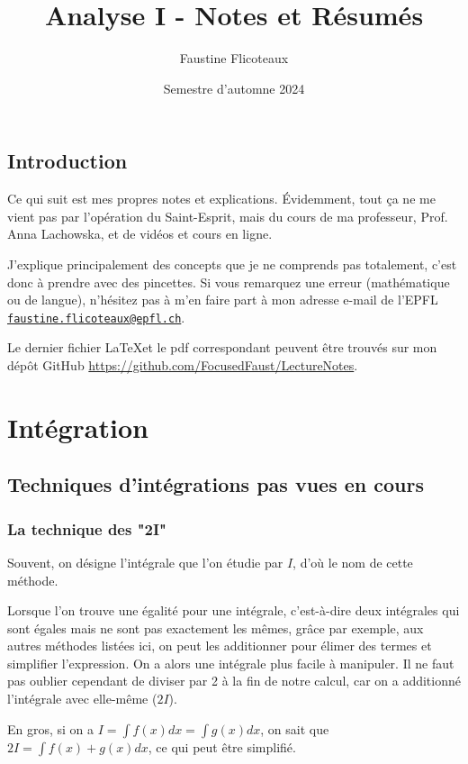 \documentclass[10pt,a4paper]{book}
\title{Analyse I - Notes et Résumés}
\author{Faustine Flicoteaux}
\date{Semestre d'automne 2024}
\begin{document}
\maketitle
\tableofcontents
\newpage


\section*{Introduction}
Ce qui suit est mes propres notes et explications. Évidemment, tout ça ne me vient pas par l'opération du Saint-Esprit, mais du cours de ma professeur, Prof. Anna Lachowska, et de vidéos et cours en ligne.\par 
J'explique principalement des concepts que je ne comprends pas totalement, c'est donc à prendre avec des pincettes. Si vous remarquez une erreur (mathématique ou de langue), n'hésitez pas à m'en faire part à mon adresse e-mail de l'EPFL \texttt{\href{mailto:faustine.flicoteaux@epfl.ch}{faustine.flicoteaux@epfl.ch}}.\par 
Le dernier fichier \LaTeX et le pdf correspondant peuvent être trouvés sur mon dépôt GitHub \url{https://github.com/FocusedFaust/LectureNotes}.


\chapter{Intégration}
\section{Techniques d'intégrations pas vues en cours}
\subsection{La technique des "2I"}
Souvent, on désigne l'intégrale que l'on étudie par $I$, d'où le nom de cette méthode.\par 
Lorsque l'on trouve une égalité pour une intégrale, c'est-à-dire deux intégrales qui sont égales mais ne sont pas exactement les mêmes, grâce par exemple, aux autres méthodes listées ici, on peut les additionner pour élimer des termes et simplifier l'expression. On a alors une intégrale plus facile à manipuler. Il ne faut pas oublier cependant de diviser par 2 à la fin de notre calcul, car on a additionné l'intégrale avec elle-même ($2I$).\par 
En gros, si on a $I=\int f(x)dx = \int g(x)dx$, on sait que $2I = \int f(x)+g(x)dx$, ce qui peut être simplifié.
\end{document}
